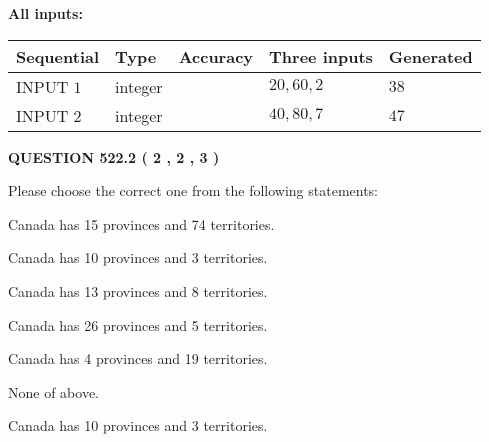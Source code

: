 \documentclass[12pt]{article}
\begin{document}
   
   
   
\noindent{}
   
   
   
   
\noindent\vspace{0.1in}\hspace{-0.08in} {\textbf{\Large{All inputs: }}}
   
   
  
  
\noindent\begin{tabular}{|l|l|l|l|l|}
\hline
 Sequential & Type & Accuracy & Three inputs & Generated \\ 
\hline
 
 
  INPUT $  1 $ & integer &  & $
 20
 , 
 60
 , 
 2
 $ & $ 38 $ 
 \\  \hline  
 
 
  INPUT $  2 $ & integer &  & $
 40
 , 
 80
 , 
 7
 $ & $ 47 $ 
 \\  \hline  
 \end{tabular}
   
   
  
\vspace{0.2in}
  
{\textbf{\Large{QUESTION
522.2 
 ( 2 , 2 , 3 )
}}}
  
  
Please choose the correct one from the following statements:
 
 
Canada has  15 provinces and  74 territories.
 
 
Canada has 10  provinces and 3 territories.
 
 
Canada has  13 provinces and  8 territories.
 
 
Canada has  26 provinces and  5 territories.
 
 
Canada has   4 provinces and  19 territories.
 
 
 None of above.
 
 
\noindent{}
 
 
Canada has 10  provinces and 3 territories.
 
 
\noindent{}
 
 
   
\end{document}
